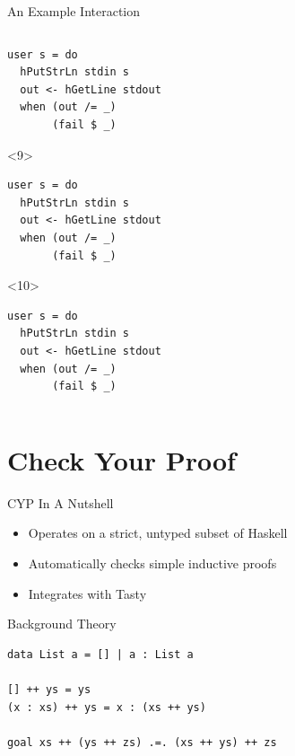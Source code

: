 \documentclass{beamer}
\begin{document}
\begin{frame}[fragile]{An Example Interaction}
\begin{columns}[t]
\begin{column}{0.5\textwidth}
\begin{onlyenv}
\begin{verbatim}
user s = do
  hPutStrLn stdin s
  out <- hGetLine stdout
  when (out /= _)
       (fail $ _)
\end{verbatim}
\end{onlyenv}
\begin{onlyenv}<9>
\begin{verbatim}
user s = do
  hPutStrLn stdin s
  out <- hGetLine stdout
  when (out /= _)
       (fail $ _)
\end{verbatim}
\end{onlyenv}
\begin{onlyenv}<10>
\begin{verbatim}
user s = do
  hPutStrLn stdin s
  out <- hGetLine stdout
  when (out /= _)
       (fail $ _)
\end{verbatim}
\end{onlyenv}
    \end{column}
  \end{columns}
\end{frame}

\section{Check Your Proof}

\begin{frame}{CYP In A Nutshell}

\begin{itemize}[<+->]
  \item Operates on a strict, untyped subset of Haskell
  \item Automatically checks simple inductive proofs
  \item Integrates with Tasty
\end{itemize}
\end{frame}

\begin{frame}[fragile]{Background Theory}
\lstset{language=CYP}
  \begin{lstlisting}
data List a = [] | a : List a

[] ++ ys = ys
(x : xs) ++ ys = x : (xs ++ ys)

goal xs ++ (ys ++ zs) .=. (xs ++ ys) ++ zs
  \end{lstlisting}
\end{frame}
\end{document}
